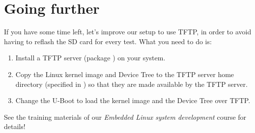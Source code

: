 \section{Going further}

If you have some time left, let's improve our setup to use TFTP, in
order to avoid having to reflash the SD card for every test. What you
need to do is:

\begin{enumerate}

\item Install a TFTP server (package ) on your system.

\item Copy the Linux kernel image and Device Tree to
  the TFTP server home directory (specified in
  ) so that they are made available by the TFTP
  server.

\item Change the U-Boot  to load the kernel image and
  the Device Tree over TFTP.

\end{enumerate}

See the training materials of our {\em Embedded Linux system
  development} course for details!

